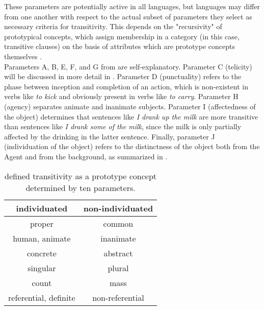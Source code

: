 These parameters are potentially active in all languages, but languages may differ from one another with respect to the actual subset of parameters they select as necessary criteria for transitivity. This depends on the "recursivity" \parencite[29]{Naess2007} of prototypical concepts, which assign membership in a category (in this case, transitive clauses) on the basis of attributes which are prototype concepts themselves \parencite[61]{taylor1995linguistic}.\\
Parameters A, B, E, F, and G from  are self-explanatory. Parameter C (telicity) will be discussed in more detail in . Parameter D (punctuality) refers to the phase between inception and completion of an action, which is non-existent in verbs like \textit{to kick} and obviously present in verbs like \textit{to carry}. Parameter H (agency) separates animate and inanimate subjects. Parameter I (affectedness of the object) determines that sentences like \textit{I drank up the milk} are more transitive than sentences like \textit{I drank some of the milk}, since the milk is only partially affected by the drinking in the latter sentence. Finally, parameter J (individuation of the object) refers to the distinctness of the object both from the Agent and from the background, as summarized in  \parencite[253]{HopperThompson1980}.

\begin{table}[htb] %
\caption{\textcite[252]{HopperThompson1980} defined transitivity as a prototype concept determined by ten parameters.}
\begin{tabular}{c|c}
 \textbf{individuated} & \textbf{non-individuated} \\
 \hline
proper & common \\
human, animate & inanimate \\
concrete & abstract \\
singular & plural \\
count & mass \\
referential, definite & non-referential
\end{tabular}
\end{table}


